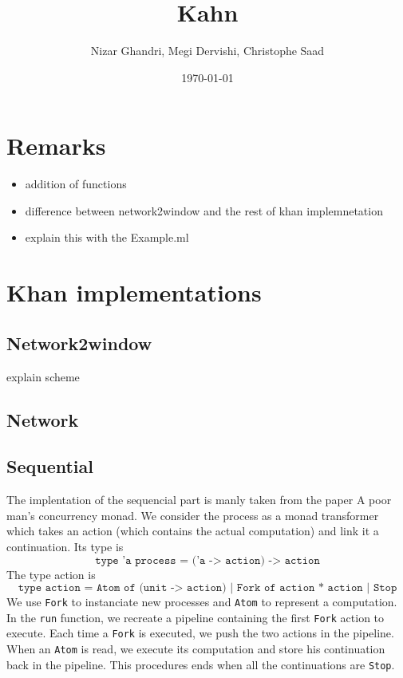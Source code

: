 \documentclass[10pt,a4paper]{article}
\title{Kahn}
\author{Nizar Ghandri, Megi Dervishi, Christophe Saad}
\date{\today}
\begin{document}
\maketitle

\section{Remarks }
\begin{itemize}
\item addition of functions
\item difference between network2window and the rest of khan implemnetation
\item explain this with the Example.ml
\end{itemize}

\section{Khan implementations }
\subsection{Network2window}
explain scheme 

\subsection{Network}


\subsection{Sequential}
The implentation of the sequencial part is manly taken from the paper  A poor man’s concurrency monad. We consider the process as a monad transformer which takes an action (which contains the actual computation) and link it a continuation. Its type is $$\texttt{type 'a process = ('a -> action) -> action}$$
The type action is $$\texttt{type action  = Atom of (unit -> action) | Fork of action * action | Stop}$$
We use \texttt{Fork} to instanciate new processes and \texttt{Atom} to represent a computation.\\
In the \texttt{run} function, we recreate a pipeline containing the first \texttt{Fork} action to execute. Each time a \texttt{Fork} is executed, we push the two actions in the pipeline. When an \texttt{Atom} is read, we execute its computation and store his continuation back in the pipeline. This procedures ends when all the continuations are \texttt{Stop}.
\end{document}
